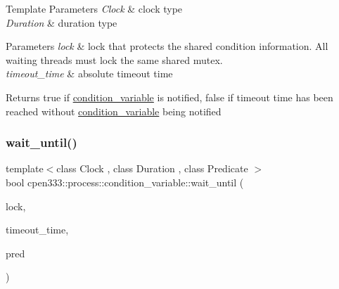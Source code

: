 \begin{DoxyTemplParams}{Template Parameters}
{\em Clock} & clock type \\
\hline
{\em Duration} & duration type \\
\hline
\end{DoxyTemplParams}

\begin{DoxyParams}{Parameters}
{\em lock} & lock that protects the shared condition information. All waiting threads must lock the same shared mutex. \\
\hline
{\em timeout\+\_\+time} & absolute timeout time \\
\hline
\end{DoxyParams}
\begin{DoxyReturn}{Returns}
{\ttfamily true} if \hyperlink{classcpen333_1_1process_1_1condition__variable}{condition\+\_\+variable} is notified, {\ttfamily false} if timeout time has been reached without \hyperlink{classcpen333_1_1process_1_1condition__variable}{condition\+\_\+variable} being notified 
\end{DoxyReturn}
\mbox{\label{classcpen333_1_1process_1_1condition__variable_adc559f5d5dd4af9505975c7e64d62d6e}} 
\subsubsection{\texorpdfstring{wait\+\_\+until()}{wait\_until()}\hspace{0.1cm}{\footnotesize\ttfamily [2/2]}}
{\footnotesize\ttfamily template$<$class Clock , class Duration , class Predicate $>$ \\
bool cpen333\+::process\+::condition\+\_\+variable\+::wait\+\_\+until (\begin{DoxyParamCaption}\item[{std\+::unique\+\_\+lock$<$ \hyperlink{classcpen333_1_1process_1_1mutex}{cpen333\+::process\+::mutex} $>$ \&}]{lock,  }\item[{const std\+::chrono\+::time\+\_\+point$<$ Clock, Duration $>$ \&}]{timeout\+\_\+time,  }\item[{Predicate}]{pred }\end{DoxyParamCaption})\hspace{0.3cm}{\ttfamily [inline]}}



